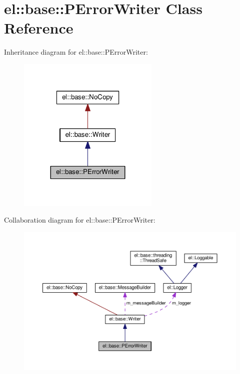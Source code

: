 \hypertarget{classel_1_1base_1_1_p_error_writer}{}\section{el\+:\+:base\+:\+:P\+Error\+Writer Class Reference}
\label{classel_1_1base_1_1_p_error_writer}


Inheritance diagram for el\+:\+:base\+:\+:P\+Error\+Writer\+:
\nopagebreak
\begin{figure}[H]
\begin{center}
\leavevmode
\includegraphics[width=191pt]{classel_1_1base_1_1_p_error_writer__inherit__graph}
\end{center}
\end{figure}


Collaboration diagram for el\+:\+:base\+:\+:P\+Error\+Writer\+:
\nopagebreak
\begin{figure}[H]
\begin{center}
\leavevmode
\includegraphics[width=350pt]{classel_1_1base_1_1_p_error_writer__coll__graph}
\end{center}
\end{figure}
